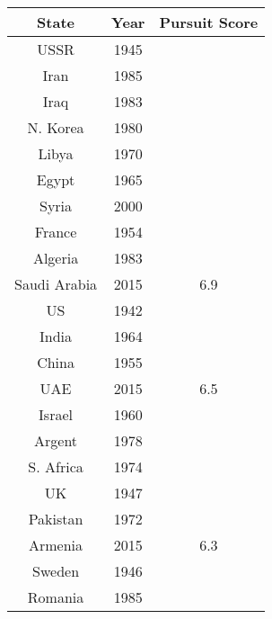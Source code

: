 \begin{table}
  \centering
  \begin{minipage}{.5\textwidth}

\begin{tabular}{|c|c|c|}
\hline
\textbf{State} & \textbf{Year}  & \textbf{Pursuit Score} \\
\hline
USSR & 1945 & \color{red}{8.9} \\
Iran & 1985 & \color{chromeyellow}{8.6} \\
Iraq & 1983 & \color{chromeyellow}{8.3} \\
N. Korea & 1980 & \color{red}{8.2} \\
Libya & 1970 & \color{red}{7.7} \\
Egypt & 1965 & \color{chromeyellow}{7.4} \\
Syria & 2000 & \color{chromeyellow}{7.3} \\
France & 1954 & \color{red}{7.1} \\
Algeria & 1983 & \color{chromeyellow}{7.0} \\
Saudi Arabia & 2015 & 6.9 \\
US & 1942 & \color{red}{6.8} \\
India & 1964 & \color{red}{6.6} \\
China & 1955 & \color{red}{6.5} \\
UAE & 2015 & 6.5 \\
Israel & 1960 & \color{red}{6.5} \\
Argent & 1978 & \color{chromeyellow}{6.4} \\
S. Africa & 1974 & \color{red}{6.4} \\
UK & 1947 & \color{red}{6.3} \\
Pakistan & 1972 & \color{red}{6.3} \\
Armenia & 2015 & 6.3 \\
Sweden & 1946 & \color{red}{6.2} \\
Romania & 1985 & \color{red}{6.1} \\


\end{tabular}
\end{minipage}
\end{table}
